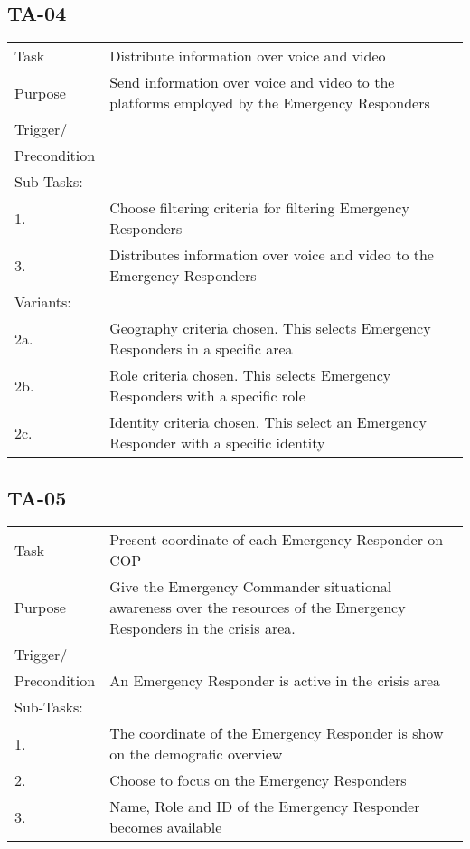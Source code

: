 \subsection{TA-04}
\begin{longtable}{| p{2.5cm}  | p{10cm} |  }
	\hline
	Task & Distribute information over voice and video \\
	Purpose & Send information over voice and video to the platforms employed by the Emergency Responders \\
	Trigger/ &  \\ Precondition &  \\
	\hline
	Sub-Tasks: & \\
	1. & Choose filtering criteria for filtering Emergency Responders \\
	3. & Distributes information over voice and video to the Emergency Responders \\
	\hline
	Variants: & \\
	2a. & Geography criteria chosen. This selects Emergency Responders in a specific area \\
	2b. & Role criteria chosen. This selects Emergency Responders with a specific role\\
	2c. & Identity criteria chosen. This select an Emergency Responder with a specific identity \\
	\hline
\end{longtable}

\newpage
\subsection{TA-05}
\begin{longtable}{| p{2.5cm}  | p{10cm} |  }
	\hline
	Task &  Present coordinate of each Emergency Responder on COP \\
	Purpose & Give the Emergency Commander situational awareness over the resources of the Emergency Responders in the crisis area. \\
	Trigger/ &  \\Precondition & An Emergency Responder is active in the crisis area\\
	\hline
	Sub-Tasks: & \\
	1. & The coordinate of the Emergency Responder is show on the demografic overview \\
	\hline
	2. & Choose to focus on the Emergency Responders \\
	\hline
	3. & Name, Role and ID of the Emergency Responder becomes available \\
	\hline
\end{longtable}

